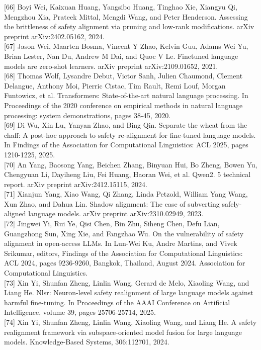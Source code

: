 \documentclass[10pt]{article}
\begin{document}
[66] Boyi Wei, Kaixuan Huang, Yangsibo Huang, Tinghao Xie, Xiangyu Qi, Mengzhou Xia, Prateek Mittal, Mengdi Wang, and Peter Henderson. Assessing the brittleness of safety alignment via pruning and low-rank modifications. arXiv preprint arXiv:2402.05162, 2024.\\[0pt]
[67] Jason Wei, Maarten Bosma, Vincent Y Zhao, Kelvin Guu, Adams Wei Yu, Brian Lester, Nan Du, Andrew M Dai, and Quoc V Le. Finetuned language models are zero-shot learners. arXiv preprint arXiv:2109.01652, 2021.\\[0pt]
[68] Thomas Wolf, Lysandre Debut, Victor Sanh, Julien Chaumond, Clement Delangue, Anthony Moi, Pierric Cistac, Tim Rault, Remi Louf, Morgan Funtowicz, et al. Transformers: State-of-the-art natural language processing. In Proceedings of the 2020 conference on empirical methods in natural language processing: system demonstrations, pages 38-45, 2020.\\[0pt]
[69] Di Wu, Xin Lu, Yanyan Zhao, and Bing Qin. Separate the wheat from the chaff: A post-hoc approach to safety re-alignment for fine-tuned language models. In Findings of the Association for Computational Linguistics: ACL 2025, pages 1210-1225, 2025.\\[0pt]
[70] An Yang, Baosong Yang, Beichen Zhang, Binyuan Hui, Bo Zheng, Bowen Yu, Chengyuan Li, Dayiheng Liu, Fei Huang, Haoran Wei, et al. Qwen2. 5 technical report. arXiv preprint arXiv:2412.15115, 2024.\\[0pt]
[71] Xianjun Yang, Xiao Wang, Qi Zhang, Linda Petzold, William Yang Wang, Xun Zhao, and Dahua Lin. Shadow alignment: The ease of subverting safely-aligned language models. arXiv preprint arXiv:2310.02949, 2023.\\[0pt]
[72] Jingwei Yi, Rui Ye, Qisi Chen, Bin Zhu, Siheng Chen, Defu Lian, Guangzhong Sun, Xing Xie, and Fangzhao Wu. On the vulnerability of safety alignment in open-access LLMs. In Lun-Wei Ku, Andre Martins, and Vivek Srikumar, editors, Findings of the Association for Computational Linguistics: ACL 2024, pages 9236-9260, Bangkok, Thailand, August 2024. Association for Computational Linguistics.\\[0pt]
[73] Xin Yi, Shunfan Zheng, Linlin Wang, Gerard de Melo, Xiaoling Wang, and Liang He. Nlsr: Neuron-level safety realignment of large language models against harmful fine-tuning. In Proceedings of the AAAI Conference on Artificial Intelligence, volume 39, pages 25706-25714, 2025.\\[0pt]
[74] Xin Yi, Shunfan Zheng, Linlin Wang, Xiaoling Wang, and Liang He. A safety realignment framework via subspace-oriented model fusion for large language models. Knowledge-Based Systems, 306:112701, 2024.\\[0pt]
\end{document}
